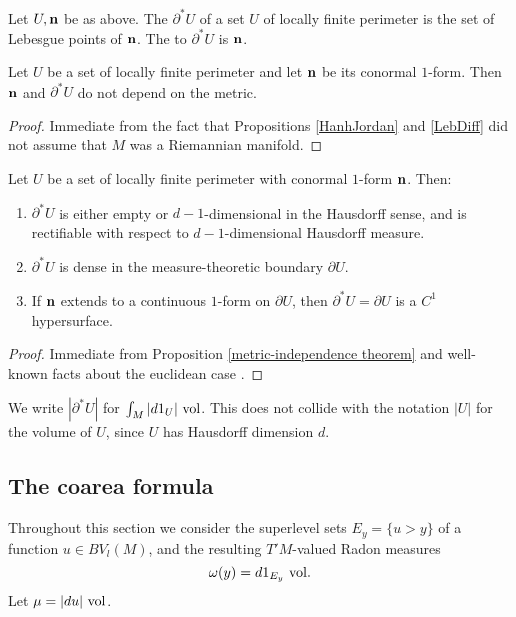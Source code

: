 \begin{definition}
Let $U,\mathbf n$ be as above.
The  $\partial^* U$ of a set $U$ of locally finite perimeter is the set of Lebesgue points of $\mathbf n$.
The  to $\partial^* U$ is $\mathbf n$.
\end{definition}

\begin{proposition}\label{metric-independence theorem}
Let $U$ be a set of locally finite perimeter and let $\mathbf n$ be its conormal $1$-form.
Then $\mathbf n$ and $\partial^* U$ do not depend on the metric.
\end{proposition}
\begin{proof}
Immediate from the fact that Propositions \ref{HanhJordan} and \ref{LebDiff} did not assume that $M$ was a Riemannian manifold.
\end{proof}

\begin{proposition}\label{locality of Caccioppoli}
Let $U$ be a set of locally finite perimeter with conormal $1$-form $\mathbf n$.
Then:
\begin{enumerate}
\item $\partial^* U$ is either empty or $d-1$-dimensional in the Hausdorff sense, and is rectifiable with respect to $d-1$-dimensional Hausdorff measure.
\item $\partial^* U$ is dense in the measure-theoretic boundary $\partial U$.
\item If $\mathbf n$ extends to a continuous $1$-form on $\partial U$, then $\partial^* U = \partial U$ is a $C^1$ hypersurface.
\end{enumerate}
\end{proposition}
\begin{proof}
Immediate from Proposition \ref{metric-independence theorem} and well-known facts about the euclidean case \cite[Chapters 2-4]{Giusti77} \cite{deGiorgi55}.
\end{proof}

\begin{notation}
We write $|\partial^* U|$ for $\int_M |d1_U| ~\mathrm{vol}$.
This does not collide with the notation $|U|$ for the volume of $U$, since $U$ has Hausdorff dimension $d$.
\end{notation}


\subsection{The coarea formula} \label{coarea section}
Throughout this section we consider the superlevel sets $E_y = \{u > y\}$ of a function $u \in BV_l(M)$, and the resulting $T'M$-valued Radon measures
$$\omega(y) = d1_{E_y} ~\mathrm{vol}.$$
Let $\mu = |du| ~\mathrm{vol}$.

